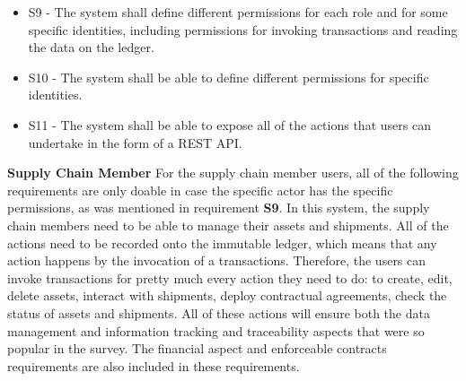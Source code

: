 \begin{itemize}
			\item S9 - The system shall define different permissions for each role and for some specific identities, including permissions for invoking transactions and reading the data on the ledger.
			\item S10 - The system shall be able to define different permissions for specific identities.
			\item S11 - The system shall be able to expose all of the actions that users can undertake in the form of a REST API.
			
		\end{itemize}
        
		\par \textbf{Supply Chain Member}
        For the supply chain member users, all of the following requirements are only doable in case the specific actor has the specific permissions, as was mentioned in requirement \textbf{S9}. In this system, the supply chain members need to be able to manage their assets and shipments. All of the actions need to be recorded onto the immutable ledger, which means that any action happens by the invocation of a transactions. Therefore, the users can invoke transactions for pretty much every action they need to do: to create, edit, delete assets, interact with shipments, deploy contractual agreements, check the status of assets and shipments. All of these actions will ensure both the data management and information tracking and traceability aspects that were so popular in the survey. The financial aspect and enforceable contracts requirements are also included in these requirements.
        
